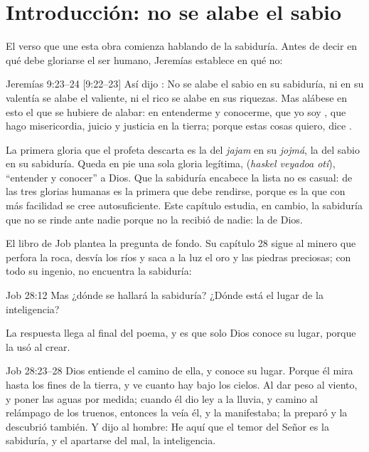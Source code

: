 
\section{Introducción: no se alabe el sabio}

El verso que une esta obra comienza hablando de la sabiduría. Antes de decir en qué debe gloriarse el ser humano, Jeremías establece en qué no:

\begin{verso}{Jeremías 9:23–24 [9:22–23]}
Así dijo \SENOR: No se alabe el sabio en su sabiduría, ni en su valentía se alabe el valiente, ni el rico se alabe en sus riquezas. Mas alábese en esto el que se hubiere de alabar: en entenderme y conocerme, que yo soy \SENOR, que hago misericordia, juicio y justicia en la tierra; porque estas cosas quiero, dice \SENOR.
\end{verso}

La primera gloria que el profeta descarta es la del \emph{jajam} en su \emph{jojmá}, la del sabio en su sabiduría. Queda en pie una sola gloria legítima,  (\emph{haskel veyadoa otí}), ``entender y conocer'' a Dios. Que la sabiduría encabece la lista no es casual: de las tres glorias humanas es la primera que debe rendirse, porque es la que con más facilidad se cree autosuficiente. Este capítulo estudia, en cambio, la sabiduría que no se rinde ante nadie porque no la recibió de nadie: la de Dios.

El libro de Job plantea la pregunta de fondo. Su capítulo 28 sigue al minero que perfora la roca, desvía los ríos y saca a la luz el oro y las piedras preciosas; con todo su ingenio, no encuentra la sabiduría:

\begin{verso}{Job 28:12}
Mas ¿dónde se hallará la sabiduría? ¿Dónde está el lugar de la inteligencia?
\end{verso}

La respuesta llega al final del poema, y es que solo Dios conoce su lugar, porque la usó al crear.

\begin{verso}{Job 28:23–28}
Dios entiende el camino de ella, y conoce su lugar. Porque él mira hasta los fines de la tierra, y ve cuanto hay bajo los cielos. Al dar peso al viento, y poner las aguas por medida; cuando él dio ley a la lluvia, y camino al relámpago de los truenos, entonces la veía él, y la manifestaba; la preparó y la descubrió también. Y dijo al hombre: He aquí que el temor del Señor es la sabiduría, y el apartarse del mal, la inteligencia.
\end{verso}

